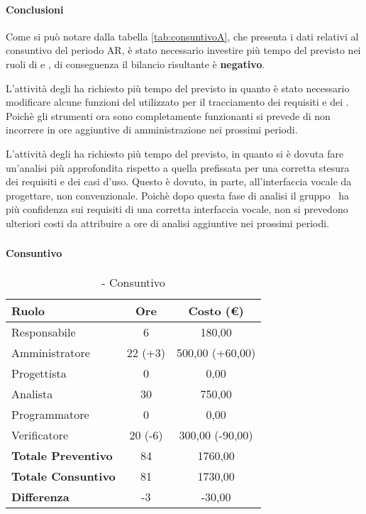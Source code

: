\documentclass[./PianoDiProgetto.tex]{subfiles}
\begin{document}
  \paragraph{Conclusioni}
		Come si può notare dalla tabella \ref{tab:consuntivoA}, che presenta i dati relativi al consuntivo del periodo AR, è stato necessario investire più tempo del previsto nei ruoli di  \AMM{} e \AN, di conseguenza il bilancio risultante è \textbf{negativo}.
		
		L'attività degli \AMMP{} ha richiesto più tempo del previsto in quanto è stato necessario modificare alcune funzioni del  utilizzato per il tracciamento dei requisiti e dei . Poichè gli strumenti ora sono completamente funzionanti si prevede di non incorrere in ore aggiuntive di amministrazione nei prossimi periodi.
		
		L'attività degli \ANP{} ha richiesto più tempo del previsto, in quanto si è dovuta fare un'analisi più approfondita rispetto a quella prefissata per una corretta stesura dei requisiti e dei casi d'uso.
		Questo è dovuto, in parte, all'interfaccia vocale da progettare, non convenzionale.
		Poichè dopo questa fase di analisi il gruppo \GRUPPO\ ha più confidenza sui requisiti di una corretta interfaccia vocale, non si prevedono ulteriori costi da attribuire a ore di analisi aggiuntive nei prossimi periodi.

\subsubsection{\PerAD}
	\paragraph{Consuntivo}
	\begin{table}[h]
		\centering
		\begin{tabular}{l * {2}{c}}
			\toprule
			\textbf{Ruolo} & \textbf{Ore} & \textbf{Costo (\euro{})} \\
			\midrule
			Responsabile &	6 & 180,00 \\
			Amministratore & 22 (+3)  & 500,00 (+60,00)\\
			Progettista & 0 & 0,00 \\
			Analista & 30 & 750,00\\
			Programmatore & 0 & 0,00 \\
			Verificatore & 20 (-6) & 300,00 (-90,00)\\
			\midrule
			\textbf{Totale Preventivo} & 84
 & 1760,00
 \\		
			\textbf{Totale Consuntivo} & 81 & 1730,00
 \\
			\midrule
			\textbf{Differenza} & -3 & -30,00 \\
			\bottomrule
		\end{tabular}
		\caption{\PerAD{} - Consuntivo}
		
	\end{table}	
\end{document}
